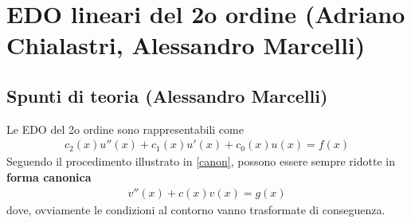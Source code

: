 \newpage

\section{EDO lineari del 2o ordine (Adriano Chialastri, Alessandro Marcelli)}


\subsection{Spunti di teoria (Alessandro Marcelli)}

Le EDO del 2o ordine sono rappresentabili come
\begin{align}
	c_2(x) u''(x) + c_1(x) u'(x) + c_0(x)u(x) = f(x)
\end{align}
Seguendo il procedimento illustrato in \ref{canon}, possono essere sempre ridotte in \textbf{forma canonica}
\begin{align}
	v''(x) + c(x)v(x) = g(x)
\end{align}
dove, ovviamente le condizioni al contorno vanno trasformate di conseguenza.


